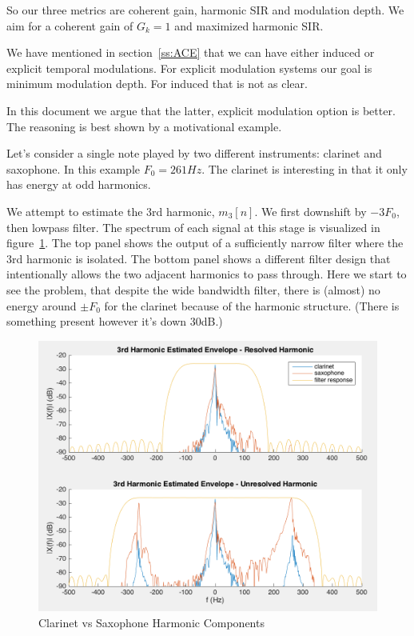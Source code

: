 \documentclass [11pt, proquest,oneside] {uwthesis}[2015/03/03]
\begin{document}
So our three metrics are coherent gain, harmonic SIR and modulation depth.  We aim for a coherent gain of $G_k = 1$ and maximized harmonic SIR.

We have mentioned in section~\ref{ss:ACE} that we can have either induced or explicit temporal modulations.  For explicit modulation systems our goal is minimum modulation depth.  For induced that is not as clear.

In this document we argue that the latter, explicit modulation option is better.  The reasoning is best shown by a motivational example.

Let's consider a single note played by two different instruments: clarinet and saxophone.  In this example $F_0 = 261Hz$.  The clarinet is interesting in that it only has energy at odd harmonics.

We attempt to estimate the 3rd harmonic, $m_3[n]$.  We first downshift by $-3F_0$, then lowpass filter.  The spectrum of each signal at this stage is visualized in figure~\ref{fig:clarinetVSsax_F}.  The top panel shows the output of a sufficiently narrow filter where the 3rd harmonic is isolated.  The bottom panel shows a different filter design that intentionally allows the two adjacent harmonics to pass through.  Here we start to see the problem, that despite the wide bandwidth filter, there is (almost) no energy around $\pm F_0$ for the clarinet because of the harmonic structure.  (There is something present however it's down 30dB.)

\begin{figure}[!ht]
  \centering
    \includegraphics[width=1\textwidth]{clarinetVSsax_F}
    \caption{Clarinet vs Saxophone Harmonic Components}\label{fig:clarinetVSsax_F}
\end{figure}
\end{document}

